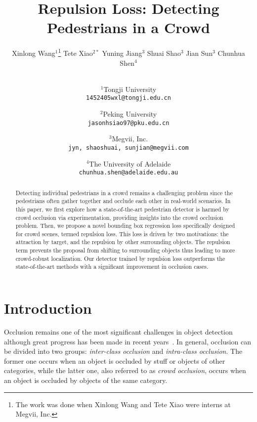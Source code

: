 \documentclass[10pt,twocolumn,letterpaper]{article}
\begin{document}
\title{Repulsion Loss: Detecting Pedestrians in a Crowd}

\author{Xinlong Wang$^1$\thanks{The work was done when Xinlong Wang and Tete Xiao were interns at Megvii, Inc.} \quad Tete Xiao$^{2*}$ \quad Yuning Jiang$^3$ \quad Shuai Shao$^3$ \quad Jian Sun$^3$ \quad Chunhua Shen$^4$ \\ \\
\and
$^1$Tongji University\\
{\tt\small 1452405wxl@tongji.edu.cn}\\
\and
$^2$Peking University\\
{\tt\small jasonhsiao97@pku.edu.cn}\\
\and
$^3$Megvii, Inc. \\
{\tt\small jyn, shaoshuai, sunjian@megvii.com}\\
\and
$^4$The University of Adelaide\\
{\tt\small chunhua.shen@adelaide.edu.au}\\
}
\maketitle



\begin{abstract}
Detecting individual pedestrians in a crowd remains a challenging problem since the pedestrians often gather together and occlude each other in real-world scenarios. In this paper, we first explore how a state-of-the-art pedestrian detector is harmed by crowd occlusion via experimentation, providing insights into the crowd occlusion problem. Then, we propose a novel bounding box regression loss specifically designed for crowd scenes, termed repulsion loss. This loss is driven by two motivations: the attraction by target, and the repulsion by other surrounding objects. The repulsion term prevents the proposal from shifting to surrounding objects thus leading to more crowd-robust localization. Our detector trained by repulsion loss outperforms the state-of-the-art methods with a significant improvement in occlusion cases.
\end{abstract}


\vspace{-0.2cm}
\section{Introduction}
\label{sec:intro}


Occlusion remains one of the most significant challenges in object detection although great progress has been made in recent years~\cite{Girshick_2014_CVPR,Girshick_2015_ICCV,NIPS2015_5638,Lin_2017_CVPR,cai2016unified,Lin_2017_ICCV,he2017mask,dai2016r}. In general, occlusion can be divided into two groups: {\it inter-class occlusion} and {\it intra-class occlusion}. The former one occurs when an object is occluded by stuff or objects of other categories, while the latter one, also referred to as {\it crowd occlusion}, occurs when an object is occluded by objects of the same category.
\end{document}
